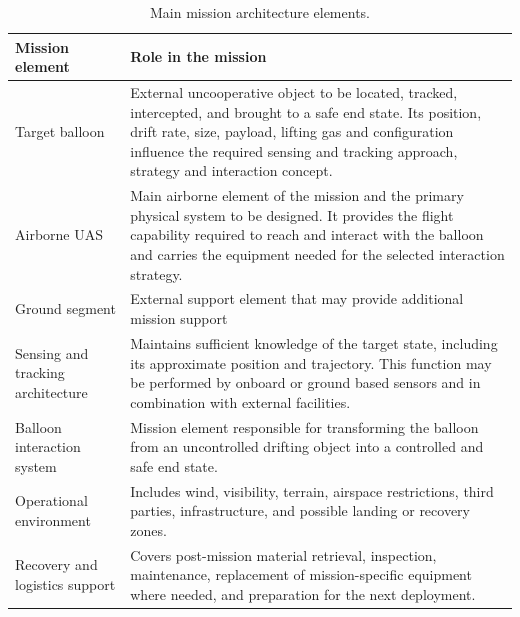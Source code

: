 \begin{table}[H]
    \centering
    \caption{Main mission architecture elements.}
    \label{tab:mission_elements}
    \begin{tabular}{p{} p{}}
        \toprule
        \textbf{Mission element} & \textbf{Role in the mission} \\
        \midrule

        Target balloon & External uncooperative object to be located, tracked, intercepted, and brought to a safe end state. Its position, drift rate, size, payload, lifting gas and configuration influence the required sensing and tracking approach, strategy and interaction concept. \\

        Airborne UAS & Main airborne element of the mission and the primary physical system to be designed. It provides the flight capability required to reach and interact with the balloon and carries the equipment needed for the selected interaction strategy.  \\

        Ground segment & External support element that may provide additional mission support\\

        Sensing and tracking architecture & Maintains sufficient knowledge of the target state, including its approximate position and trajectory. This function may be performed by onboard or ground based sensors and in combination with external facilities.  \\

        Balloon interaction system & Mission element responsible for transforming the balloon from an uncontrolled drifting object into a controlled and safe end state.  \\

        Operational environment & Includes wind, visibility, terrain, airspace restrictions, third parties, infrastructure, and possible landing or recovery zones.  \\

        Recovery and logistics support & Covers post-mission material retrieval, inspection, maintenance, replacement of mission-specific equipment where needed, and preparation for the next deployment. \\

        \bottomrule
    \end{tabular}
\end{table}




